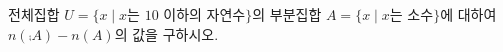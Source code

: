 전체집합 $U=\{x \mid x$는 $10$ 이하의 자연수$\}$의 부분집합 $A=\{x \mid x$는 소수$\}$에 대하여 $n(\comp{A})-n(A)$의 값을 구하시오.
